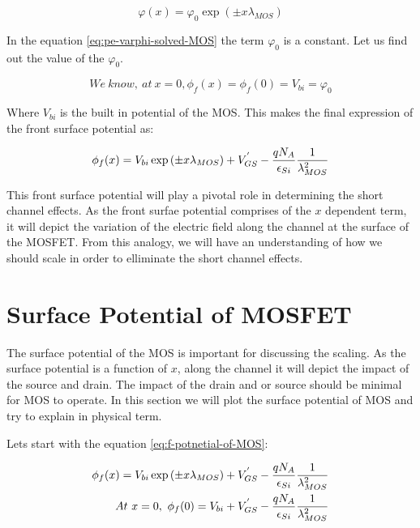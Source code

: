 \documentclass[a4paper]{article}
\begin{document}
\begin{equation}
  \label{eq:pe-varphi-solved-MOS}
  \varphi(x) = \varphi_0 \exp\left({\pm x \lambda_{MOS}}\right)
\end{equation}

In the equation \ref {eq:pe-varphi-solved-MOS} the term $\varphi_0$ is a constant. Let us find out the value of the $\varphi_0$.

\begin{equation}
  \label{eq:varphi-0-vbi}
  We~know,~at~x=0, \phi_f(x)=\phi_f(0)=V_{bi}=\varphi_0
\end{equation}

Where $V_{bi}$ is the built in potential of the MOS. This makes the final expression of the front surface potential as:

\begin{equation}
  \label{eq:f-potnetial-of-MOS}
  \phi_f(x) = V_{bi} \exp \left({\pm x \lambda_{MOS}}\right) + V_{GS}^{'} - \frac{qN_A} {\epsilon_{Si}} \frac{1}{\lambda_{MOS}^2}
\end{equation}

This front surface potential will play a pivotal role in determining the short channel effects. As the front surfae potential comprises of the $x$ dependent term, it will depict the variation of the electric field along the channel at the surface of the MOSFET. From this analogy, we will have an understanding of how we should scale in order to elliminate the short channel effects.

\section{Surface Potential of MOSFET}

The surface potential of the MOS is important for discussing the scaling. As the surface potential is a function of $x$, along the channel it will depict the impact of the source and drain. The impact of the drain and or source should be minimal for MOS to operate. In this section we will plot the surface potential of MOS and try to explain in physical term.

Lets start with the equation \ref{eq:f-potnetial-of-MOS}:

\begin{align*}
  \phi_f(x) = V_{bi} \exp \left({\pm x \lambda_{MOS}}\right) + V_{GS}^{'} - \frac{qN_A} {\epsilon_{Si}} \frac{1}{\lambda_{MOS}^2}\\
  At~x=0,~\phi_f(0) = V_{bi} + V_{GS}^{'} -\frac{qN_A} {\epsilon_{Si}} \frac{1}{\lambda_{MOS}^2}
\end{align*}
\end{document}
